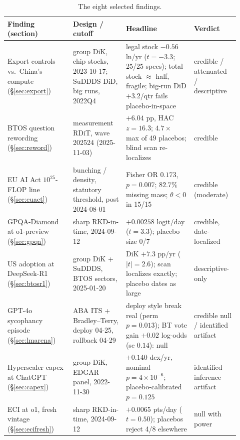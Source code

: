 \documentclass[11pt]{article}
\begin{document}
\begin{table}[t]
\centering
\footnotesize
\setlength{\tabcolsep}{4pt}
\caption{The eight selected findings.}
\label{tab:overview}
\begin{tabular}{@{}p{0.265\linewidth}p{0.215\linewidth}p{0.27\linewidth}p{0.165\linewidth}@{}}
\toprule
Finding (section) & Design / cutoff & Headline & Verdict \\
\midrule
Export controls vs.\ China's compute (\S\ref{sec:export}) &
group DiK, chip stocks, 2023-10-17; SuDDDS DiD, big runs, 2022Q4 &
legal stock $-0.56$ ln/yr ($t=-3.3$; 25/25 specs); total stock $\approx$ half,
fragile; big-run DiD $+3.2$/qtr fails placebo-in-space &
credible / attenuated / descriptive \\
\addlinespace
BTOS question rewording (\S\ref{sec:reword}) &
measurement RDiT, wave 202524 (2025-11-03) &
$+6.04$ pp, HAC $z=16.3$; $4.7\times$ max of 49 placebos; blind scan
re-localizes &
credible \\
\addlinespace
EU AI Act $10^{25}$-FLOP line (\S\ref{sec:euact}) &
bunching / density, statutory threshold, post 2024-08-01 &
Fisher OR $0.173$, $p=0.007$; $82.7\%$ missing mass; $\theta<0$ in 15/15 &
credible (moderate) \\
\addlinespace
GPQA-Diamond at o1-preview (\S\ref{sec:gpqa}) &
sharp RKD-in-time, 2024-09-12 &
$+0.00258$ logit/day ($t=3.3$); placebo size 0/7 &
credible, date-localized \\
\addlinespace
US adoption at DeepSeek-R1 (\S\ref{sec:btosr1}) &
group DiK + SuDDDS, BTOS sectors, 2025-01-20 &
DiK $+7.3$ pp/yr ($|t|=2.6$); scan localizes exactly; placebo dates as large
&
descriptive-only \\
\addlinespace
GPT-4o sycophancy episode (\S\ref{sec:lmarena}) &
ABA ITS + Bradley--Terry, deploy 04-25, rollback 04-29 &
deploy style break real (perm $p=0.013$); BT vote gain $+0.02$ log-odds (se
$0.14$): null &
credible null / identified artifact \\
\addlinespace
Hyperscaler capex at ChatGPT (\S\ref{sec:capex}) &
group DiK, EDGAR panel, 2022-11-30 &
$+0.140$ dex/yr, nominal $p=4\times10^{-6}$; placebo-calibrated $p=0.125$
&
identified inference artifact \\
\addlinespace
ECI at o1, fresh vintage (\S\ref{sec:ecifresh}) &
sharp RKD-in-time, 2024-09-12 &
$+0.0065$ pts/day ($t=0.50$); placebos reject 4/8 elsewhere &
null with power \\
\bottomrule
\end{tabular}
\end{table}
\end{document}
